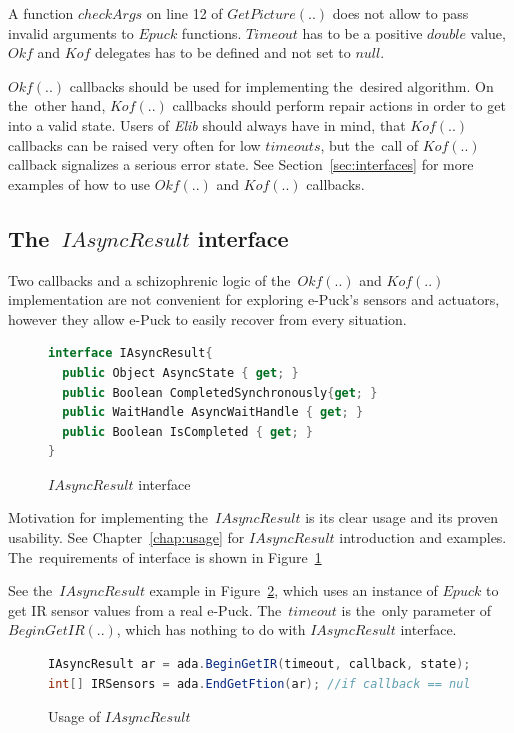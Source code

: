   A function $checkArgs$ on line 12 of $GetPicture(..)$ does not allow to pass invalid arguments
  to $Epuck$ functions. $Timeout$ has to be a positive $double$ value, $Okf$ and $Kof$ delegates 
  has to be defined and not set to $null$.

  $Okf(..)$ callbacks should be used for implementing the~desired algorithm.
  On the~other hand, $Kof(..)$ callbacks should perform repair actions in order to get into a valid state.
  Users of {\it Elib} should always have in mind,
  that $Kof(..)$ callbacks can be raised very often for low $timeouts$,
  but the~call of $Kof(..)$ callback signalizes a serious error state.
  See Section~\ref{sec:interfaces} for more examples of how to use $Okf(..)$ and $Kof(..)$ callbacks.


\subsection{The~$IAsyncResult$ interface} \label{sec:iasync}
  Two callbacks and a schizophrenic logic of the~$Okf(..)$ and $Kof(..)$ implementation are not
  convenient for exploring e-Puck's sensors and actuators, 
  however they allow e-Puck to easily recover from every situation.

\begin{figure}[!hbp]
\begin{lstlisting}[language=cs]
interface IAsyncResult{
  public Object AsyncState { get; }
  public Boolean CompletedSynchronously{get; } 
  public WaitHandle AsyncWaitHandle { get; }
  public Boolean IsCompleted { get; }
}
\end{lstlisting}
\caption{$IAsyncResult$ interface}
\label{interface}
\end{figure}

  Motivation for implementing the~$IAsyncResult$ is its clear usage and its proven usability.
  See Chapter~\ref{chap:usage} for $IAsyncResult$ introduction and examples.
  The~requirements of interface is shown in Figure~\ref{interface}

  See the~$IAsyncResult$ example in Figure~\ref{arexample}, which uses an instance
  of $Epuck$ to get IR sensor values from a real e-Puck. The~$timeout$ is the~only parameter of $BeginGetIR(..)$,
  which has nothing to do with $IAsyncResult$ interface.

\begin{figure}[!hbp]
\begin{lstlisting}[language=cs]
IAsyncResult ar = ada.BeginGetIR(timeout, callback, state);            
int[] IRSensors = ada.EndGetFtion(ar); //if callback == null
\end{lstlisting}
\caption{Usage of $IAsyncResult$}\label{arexample}
\end{figure}

